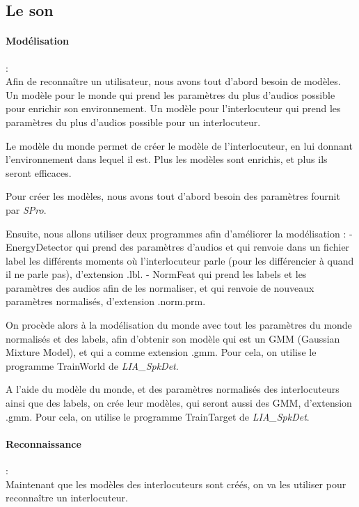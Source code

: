 \subsection{Le son}
\label{subsec:son}


\paragraph*{Modélisation} : \\

Afin de reconnaître un utilisateur, nous avons tout d'abord besoin de modèles.
Un modèle pour le monde qui prend les paramètres du plus d'audios possible pour enrichir son environnement.
Un modèle pour l'interlocuteur qui prend les paramètres du plus d'audios possible pour un interlocuteur.

Le modèle du monde permet de créer le modèle de l'interlocuteur, en lui donnant l'environnement dans lequel il est.
Plus les modèles sont enrichis, et plus ils seront efficaces.

Pour créer les modèles, nous avons tout d'abord besoin des paramètres fournit par \textit{SPro}.

Ensuite, nous allons utiliser deux programmes afin d'améliorer la modélisation :
- EnergyDetector qui prend des paramètres d'audios et qui renvoie dans un fichier label les différents moments où l'interlocuteur parle (pour les différencier
à quand il ne parle pas), d'extension .lbl.
- NormFeat qui prend les labels et les paramètres des audios afin de les normaliser, et qui renvoie de nouveaux paramètres normalisés, d'extension .norm.prm.

On procède alors à la modélisation du monde avec tout les paramètres du monde normalisés et des labels, afin d'obtenir son modèle qui est un GMM
(Gaussian Mixture Model), et qui a comme extension .gmm.
Pour cela, on utilise le programme TrainWorld de \textit{  LIA\_SpkDet}.

A l'aide du modèle du monde, et des paramètres normalisés des interlocuteurs ainsi que des labels, on crée leur modèles, qui seront aussi des GMM,
d'extension .gmm.
Pour cela, on utilise le programme TrainTarget de \textit{ LIA\_SpkDet}.


\paragraph*{Reconnaissance} : \\

Maintenant que les modèles des interlocuteurs sont créés, on va les utiliser pour reconnaître un interlocuteur.

